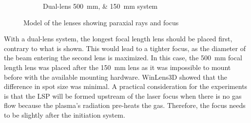 \begin{figure}[!ht]
\begin{subfigure}[t]{0.45\textwidth}
                    \caption{Dual-lens \qtylist{500;150}{mm} system}
                \end{subfigure}
                \caption{Model of the lenses showing paraxial rays and focus}
                \label{fig:modeled lenses}
            \end{figure}

            With a dual-lens system, the longest focal length lens should be placed first, contrary to what is shown. This would lead to a tighter focus, as the diameter of the beam entering the second lens is maximized. In this case, the \qty{500}{mm} focal length lens was placed after the \qty{150}{mm} lens as it was impossible to mount before with the available mounting hardware. WinLens3D showed that the difference in spot size was minimal. A practical consideration for the experiments is that the LSP will be formed upstream of the laser focus when there is no gas flow because the plasma's radiation pre-heats the gas. Therefore, the focus needs to be slightly after the initiation system.

